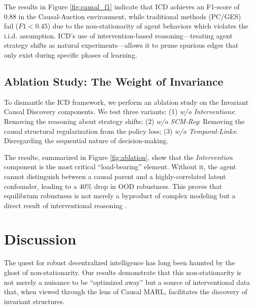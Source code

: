 
The results in Figure \ref{fig:causal_f1} indicate that ICD achieves an F1-score of $0.88$ in the Causal-Auction environment, while traditional methods (PC/GES) fail ($F1 < 0.45$) due to the non-stationarity of agent behaviors which violates the i.i.d. assumption. ICD’s use of intervention-based reasoning—treating agent strategy shifts as natural experiments—allows it to prune spurious edges that only exist during specific phases of learning.

\subsection{Ablation Study: The Weight of Invariance}
To dismantle the ICD framework, we perform an ablation study on the Invariant Causal Discovery components. We test three variants: (1) \textit{w/o Interventions}: Removing the reasoning about strategy shifts; (2) \textit{w/o SCM-Reg}: Removing the causal structural regularization from the policy loss; (3) \textit{w/o Temporal-Links}: Disregarding the sequential nature of decision-making.

The results, summarized in Figure \ref{fig:ablation}, show that the \textit{Intervention} component is the most critical ``load-bearing'' element. Without it, the agent cannot distinguish between a causal parent and a highly-correlated latent confounder, leading to a $40\%$ drop in OOD robustness. This proves that equilibrium robustness is not merely a byproduct of complex modeling but a direct result of interventional reasoning \cite{peters2016causal, scholkopf2021causality}.

\section{Discussion}
\label{sec:discussion}

The quest for robust decentralized intelligence has long been haunted by the ghost of non-stationarity. Our results demonstrate that this non-stationarity is not merely a nuisance to be ``optimized away'' but a source of interventional data that, when viewed through the lens of Causal MARL, facilitates the discovery of invariant structures. 

